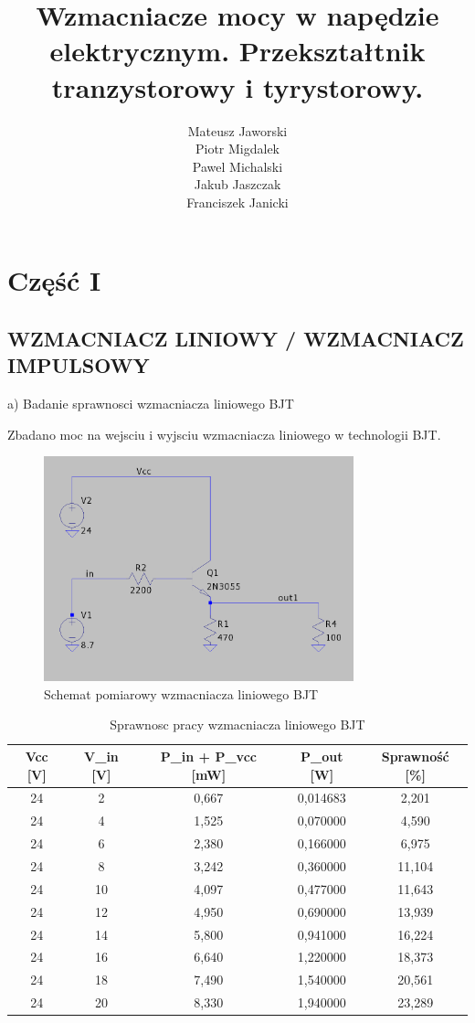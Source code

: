 \documentclass[11pt]{article}
\title{Wzmacniacze mocy w napędzie elektrycznym. Przekształtnik tranzystorowy i tyrystorowy.}
\author{
  Mateusz Jaworski \\
  Piotr Migdalek \\
  Pawel Michalski \\
  Jakub Jaszczak \\
  Franciszek Janicki
}
\begin{document}
\maketitle

\section{Część I}

\subsection{WZMACNIACZ LINIOWY / WZMACNIACZ IMPULSOWY}

a) Badanie sprawnosci wzmacniacza liniowego BJT

Zbadano moc na wejsciu i wyjsciu wzmacniacza liniowego w technologii BJT.\\

\begin{figure}[H]
\centering
\includegraphics[width=0.8\textwidth]{aun1_liniowy_bjt.png}
\caption{Schemat pomiarowy wzmacniacza liniowego BJT}
\end{figure}

\begin{table}[H]
\centering
\begin{tabular}{|c|c|c|c|c|}
\hline
\textbf{Vcc [V]} & \textbf{V\_in [V]} & \textbf{P\_in + P\_vcc [mW]} & \textbf{P\_out [W]} & \textbf{Sprawność [\%]} \\
\hline
24 & 2  & 0{,}667  & 0{,}014683 & 2{,}201 \\
\hline
24 & 4  & 1{,}525  & 0{,}070000 & 4{,}590 \\
\hline
24 & 6  & 2{,}380  & 0{,}166000 & 6{,}975 \\
\hline
24 & 8  & 3{,}242  & 0{,}360000 & 11{,}104 \\
\hline
24 & 10 & 4{,}097  & 0{,}477000 & 11{,}643 \\
\hline
24 & 12 & 4{,}950  & 0{,}690000 & 13{,}939 \\
\hline
24 & 14 & 5{,}800  & 0{,}941000 & 16{,}224 \\
\hline
24 & 16 & 6{,}640  & 1{,}220000 & 18{,}373 \\
\hline
24 & 18 & 7{,}490  & 1{,}540000 & 20{,}561 \\
\hline
24 & 20 & 8{,}330  & 1{,}940000 & 23{,}289 \\
\hline
\end{tabular}
\caption{Sprawnosc pracy wzmacniacza liniowego BJT}
\end{table}
\end{document}
